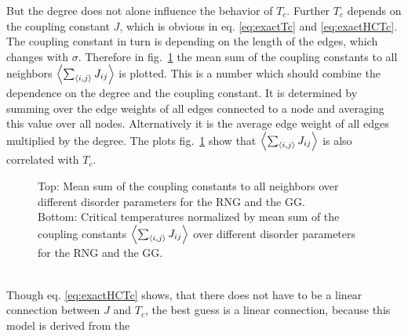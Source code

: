     But the degree does not alone influence the behavior of \(T_c\).
    Further \(T_c\) depends on the coupling constant \(J\), which is
    obvious in eq. \eqref{eq:exactTc} and \eqref{eq:exactHCTc}. The
    coupling constant in turn is depending on the length of the edges,
    which changes with \(\sigma\).
    Therefore  in fig.\ \ref{fig:TcJ}
    the mean sum of the coupling constants to all neighbors \(\left< \sum_{\left< i,j \right>} J_{ij} \right>\)
    is plotted. This is a number which should combine the dependence on
    the degree and the coupling constant. It is determined by summing
    over the edge weights of all edges connected to a node and averaging
    this value over all nodes. Alternatively it is the average edge weight
    of all edges multiplied by the degree.
    The plots fig.\ \ref{fig:TcJ}
    show that \(\left< \sum_{\left< i,j \right>} J_{ij} \right>\) is also correlated with \(T_c\).
    \begin{figure}[htbp]
        \centering


        \caption[Critical Temperature Normalized by Mean Sum of the Coupling Constants]
        {
            Top: Mean sum of the coupling constants to all
            neighbors over different disorder parameters for
             the RNG and
             the GG.\\
            Bottom: Critical temperatures normalized by mean sum of the
            coupling constants \(\left< \sum_{\left< i,j \right>} J_{ij} \right>\) over different
            disorder parameters for
             the RNG and
             the GG.
        }
        \label{fig:TcJ}
    \end{figure}\\
    Though eq. \eqref{eq:exactHCTc} shows, that there does not have
    to be a linear connection between \(J\) and \(T_c\), the best guess
    is a linear connection, because this model is derived from the
